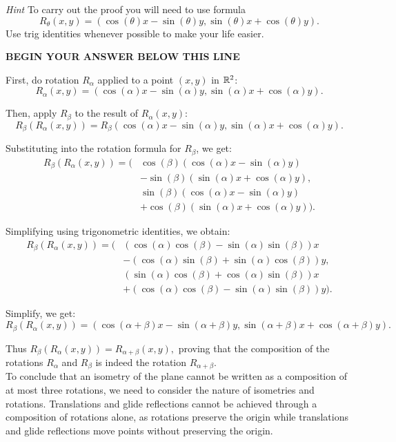 \documentclass[letter,12pt]{article}
\newcommand{\answerspacetop}{
	\begin{center}
		\textbf{BEGIN YOUR ANSWER BELOW THIS LINE} \\ \hrulefill
	\end{center}
}
\begin{document}
\textit{Hint} To carry out the proof you will need to use formula \begin{equation}R_\theta(x,y)=(\cos(\theta)x -\sin(\theta)y,\sin(\theta)x +\cos(\theta)y ).
\end{equation}
Use trig identities whenever possible to make your life easier.

\answerspacetop
First, do rotation $R_\alpha$ applied to a point $(x,y)$ in $\Bbb R^2$:
$$R_\alpha(x,y) = (\cos(\alpha)x - \sin(\alpha)y, \sin(\alpha)x + \cos(\alpha)y).$$

Then, apply $R_\beta$ to the result of $R_\alpha(x,y)$:
$$R_\beta(R_\alpha(x,y)) = R_\beta(\cos(\alpha)x - \sin(\alpha)y, \sin(\alpha)x + \cos(\alpha)y).$$

Substituting into the rotation formula for $R_\beta$, we get:
\begin{align*}
	R_\beta(R_\alpha(x,y)) = \big(&\cos(\beta)(\cos(\alpha)x - \sin(\alpha)y) \\
	&- \sin(\beta)(\sin(\alpha)x + \cos(\alpha)y), \\
	&\sin(\beta)(\cos(\alpha)x - \sin(\alpha)y) \\
	&+ \cos(\beta)(\sin(\alpha)x + \cos(\alpha)y)\big).
\end{align*}

Simplifying using trigonometric identities, we obtain:
\begin{align*}
	R_\beta(R_\alpha(x,y)) = \big(&(\cos(\alpha)\cos(\beta) - \sin(\alpha)\sin(\beta))x \\
	&- (\cos(\alpha)\sin(\beta) + \sin(\alpha)\cos(\beta))y, \\
	&(\sin(\alpha)\cos(\beta) + \cos(\alpha)\sin(\beta))x \\
	&+ (\cos(\alpha)\cos(\beta) - \sin(\alpha)\sin(\beta))y\big).
\end{align*}

Simplify, we get:
$$R_\beta(R_\alpha(x,y)) = (\cos(\alpha + \beta)x - \sin(\alpha + \beta)y, \sin(\alpha + \beta)x + \cos(\alpha + \beta)y).$$

Thus $R_\beta(R_\alpha(x,y)) = R_{\alpha+\beta}(x,y),$ proving that the composition of the rotations $R_{\alpha}$ and $R_{\beta}$ is indeed the rotation $R_{\alpha+\beta}$.\\

To conclude that an isometry of the plane cannot be written as a composition of at most three rotations, we need to consider the nature of isometries and rotations. Translations and glide reflections cannot be achieved through a composition of rotations alone, as rotations preserve the origin while translations and glide reflections move points without preserving the origin.\\
\end{document}
